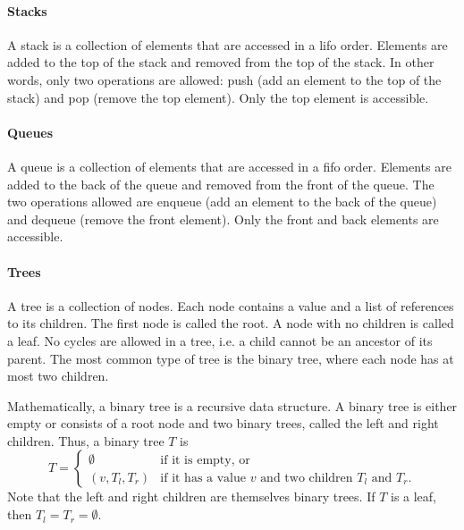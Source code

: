 
\paragraph{Stacks}  A stack is a collection of elements that are accessed in a
\gls{lifo} order.  Elements are added to the top of the stack and
removed from the top of the stack.  In other words, only two operations are
allowed: push (add an element to the top of the stack) and pop (remove the top element).
Only the top element is accessible.

\paragraph{Queues}  A queue is a collection of elements that are accessed in a
\gls{fifo} order.  Elements are added to the back of the queue and
removed from the front of the queue.  The two operations allowed are enqueue (add an
element to the back of the queue) and dequeue (remove the front element).  Only the
front and back elements are accessible.

\paragraph{Trees}  A tree is a collection of nodes.  Each node contains a value and a list
of references to its children.  The first node is called the root.  A node with no
children is called a leaf.  No cycles are allowed in a tree, i.e. a child cannot be an
ancestor of its parent. The most common type of tree is the binary tree, where each node
has at most two children.

Mathematically, a binary tree is a recursive data structure.  A binary tree is either
empty or consists of a root node and two binary trees, called the left and right
children.   Thus, a binary tree $T$ is
\[
  T = \begin{cases}
    \emptyset & \text{if it is empty, or} \\
    \left(v, T_l, T_r\right) & \text{if it has a value $v$ and two children $T_l$ and $T_r$.}
  \end{cases}
\]
Note that the left and right children are themselves binary trees.  If $T$ is a leaf,
then $T_l = T_r = \emptyset$.

